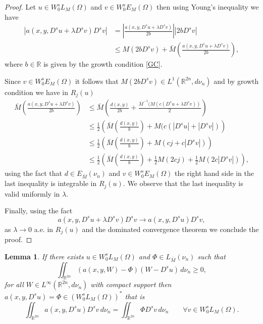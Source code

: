 \documentclass{amsart}
\newcommand{\R}{{\mathbb R}}
\newtheorem{lema}[teo]{Lemma}
\theoremstyle{remark}
\theoremstyle{definition}
\numberwithin{equation}{section}
\begin{document}
\begin{proof}
Let $u\in W_0^sL_M(\Omega)$  and $v\in W_0^s E_M(\Omega)$ then using Young's inequality we have
\begin{align*}
|a(x,y,D^su+\lambda D^s v)D^s v| &= \left |\frac{a(x,y,D^su+\lambda D^s v)}{2 b}\right | \left |2  b D^s v\right | 
\\
&\le M(2 b D^s v) + \bar M\left (\frac{a(x,y,D^su+\lambda D^s v)}{2 b}\right ),	
\end{align*}
where $b\in\R$ is given by the growth condition \eqref{GC}.

Since $v\in W^s_0 E_M(\Omega)$ it follows that $M(2 b D^s v)\in L^1(\R^{2n}, d\nu_n)$ and by growth condition we have in $R_j(u)$
\begin{align*}
\bar M\left (\frac{a(x,y,D^su+\lambda D^s v)}{2 b}\right ) &\le \bar M\left (\frac{ d(x,y)}{2 b} +\frac{\bar M^{-1}(M(c (D^su+\lambda D^s v))}{2}\right )\\
&\le \frac12\left(\bar M\left (\frac{d(x, y)}{b}\right)+M(c(|D^s u|+|D^s v|)\right)
\\
&\le \frac{1}{2}\left ( \bar{M}\left (\frac{d(x, y)}{b}\right )+M(cj+c|D^s v|)\right )
\\
&\le \frac12 \left ( \bar{M}\left (\frac{d(x, y)}{b}\right )+\frac12 M(2cj)+\frac12 M(2c|D^s v|) \right ),
\end{align*}
using the fact that $d\in E_{\bar{M}}(\nu_n)$ and $v\in W_0^s E_M(\Omega)$ the right hand side in the last inequality is integrable in $R_j(u)$. We observe that the last inequality is valid uniformly in $\lambda$.

Finally, using the fact 
$$
a(x,y,D^su+\lambda D^sv)D^sv\to a(x,y,D^su)D^sv,
$$
as $\lambda\to 0$ a.e. in $R_j(u)$ and the dominated convergence theorem we conclude the proof.
\end{proof}
\begin{lema}\label{paraEulerLagrange}
If there exists $u \in W_0^sL_M(\Omega)$ and $\Phi \in L_{\bar{M}}(\nu_n)$ such that
\begin{equation}\label{desi}
\iint_{\R^{2n}} (a(x,y,W)-\Phi)(W-D^s u)\,d\nu_n\geq 0,	
\end{equation}
for all $W\in L^{\infty}(\R^{2n},d\nu_n)$ with compact support then $a(x,y,D^su)=\Phi \in (W_0^sL_M(\Omega))^*$ that is
$$
\iint_{\R^{2n}}a(x,y,D^su)D^sv\,d\nu_n =\iint_{\R^{2n}}\Phi D^sv\,d\nu_n \qquad \forall v \in W_0^sL_M(\Omega).
$$
\end{lema}
\end{document}
